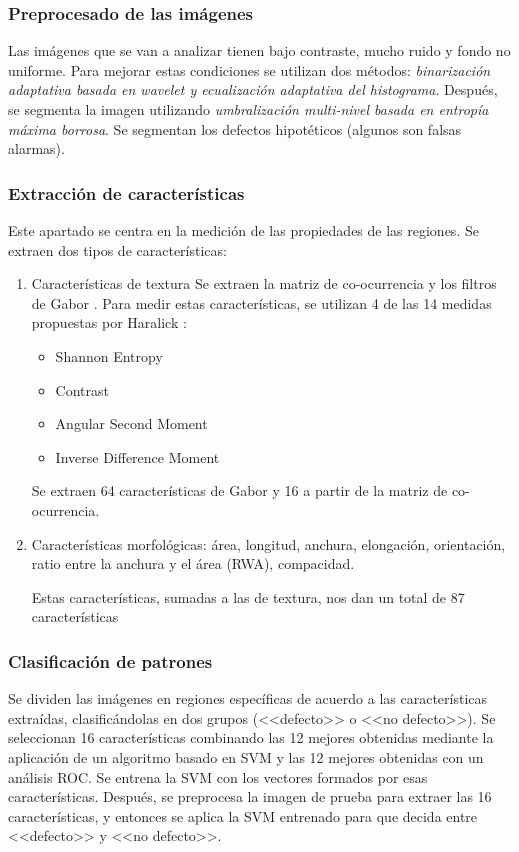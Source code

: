 \subsubsection{Preprocesado de las imágenes}
 Las imágenes que se van a analizar tienen bajo contraste, mucho ruido y fondo no uniforme. Para mejorar estas condiciones se utilizan dos métodos: \textit{binarización adaptativa basada en wavelet y ecualización adaptativa del histograma}. 
Después, se segmenta la imagen utilizando \textit{umbralización multi-nivel basada en entropía máxima borrosa}.
Se segmentan los defectos hipotéticos (algunos son falsas alarmas).


\subsubsection{Extracción de características}
Este apartado se centra en la medición de las propiedades de las regiones. Se extraen dos tipos de características:
	\begin{enumerate}
	\item Características de textura
	Se extraen la matriz de co-ocurrencia y los filtros de Gabor \cite{daugman1988complete}. Para medir estas características, se utilizan 4 de las 14 medidas propuestas por Haralick \cite{haralick1973textural}:
		\begin{itemize}
		\item Shannon Entropy
		\item Contrast
		\item Angular Second Moment
		\item Inverse Difference Moment
		\end{itemize}
	Se extraen 64 características de Gabor y 16 a partir de la matriz de co-ocurrencia.

	\item Características morfológicas: área, longitud, anchura, elongación, orientación, ratio entre la anchura y el área (RWA), compacidad.
	
	Estas características, sumadas a las de textura, nos dan un total de 87 características
	\end{enumerate}


\subsubsection{Clasificación de patrones}
Se dividen las imágenes en regiones específicas de acuerdo a las características extraídas, clasificándolas en dos grupos (<<defecto>> o <<no defecto>>).
Se seleccionan 16 características combinando las 12 mejores obtenidas mediante la aplicación de un algoritmo basado en SVM y las 12 mejores obtenidas con un análisis ROC.
Se entrena la SVM con los vectores formados por esas características.
Después, se preprocesa la imagen de prueba para extraer las 16 características, y entonces se aplica la SVM entrenado para que decida entre <<defecto>> y <<no defecto>>.